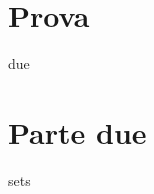 \section{Prova}
\gls{due}

\lipsum[1-25]

\section{Parte due}
\lipsum[2-30]
\cite{zenesini2024false}
\Glspl{set}

